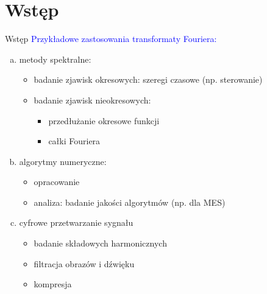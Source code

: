 \section{Wstęp}
\begin{frame}{Wstęp}
	\textcolor{blue}{Przykładowe zastosowania transformaty Fouriera:}
	
	\begin{enumerate}[a)]
		\item metody spektralne:
		\begin{itemize}
			\item badanie zjawisk okresowych: szeregi czasowe (np. sterowanie)
			\item badanie zjawisk nieokresowych:
			\begin{itemize}
				\item przedłużanie okresowe funkcji
				\item całki Fouriera
			\end{itemize}
		\end{itemize}
        \item algorytmy numeryczne:
        \begin{itemize}
        	\item opracowanie
        	\item analiza: badanie jakości algorytmów (np. dla MES)
        \end{itemize}
        \item cyfrowe przetwarzanie sygnału
        \begin{itemize}
        	\item badanie składowych harmonicznych
        	\item filtracja obrazów i dźwięku
        	\item kompresja
		\end{itemize}        	
	\end{enumerate}
\end{frame}